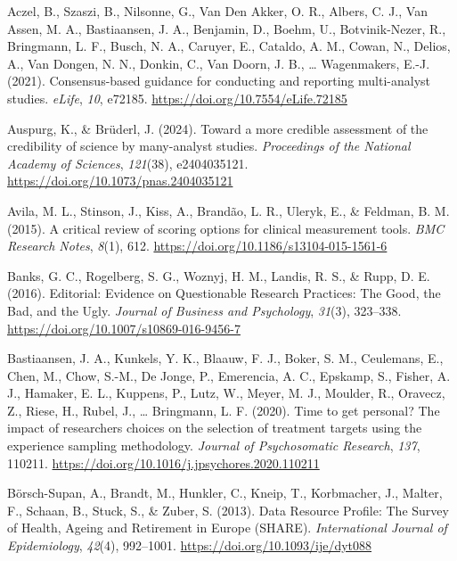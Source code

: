 \documentclass[
  man,
  floatsintext,
  longtable,
  nolmodern,
  notxfonts,
  notimes,
  colorlinks=true,linkcolor=blue,citecolor=blue,urlcolor=blue]{apa7}
\newlength{\cslhangindent}
\newenvironment{CSLReferences}[2] %
 {\begin{list}{}{%
  \setlength{\itemindent}{0pt}
  \setlength{\leftmargin}{0pt}
  \setlength{\parsep}{0pt}
  \ifodd #1
   \setlength{\leftmargin}{\cslhangindent}
   \setlength{\itemindent}{-1\cslhangindent}
  \fi
  \setlength{\itemsep}{#2\baselineskip}}}
 {\end{list}}
\begin{document}
\label{refs}
\begin{CSLReferences}{1}{0}
Aczel, B., Szaszi, B., Nilsonne, G., Van Den Akker, O. R., Albers, C.
J., Van Assen, M. A., Bastiaansen, J. A., Benjamin, D., Boehm, U.,
Botvinik-Nezer, R., Bringmann, L. F., Busch, N. A., Caruyer, E.,
Cataldo, A. M., Cowan, N., Delios, A., Van Dongen, N. N., Donkin, C.,
Van Doorn, J. B., \ldots{} Wagenmakers, E.-J. (2021). Consensus-based
guidance for conducting and reporting multi-analyst studies.
\emph{eLife}, \emph{10}, e72185.
\url{https://doi.org/10.7554/eLife.72185}

Auspurg, K., \& Brüderl, J. (2024). Toward a more credible assessment of
the credibility of science by many-analyst studies. \emph{Proceedings of
the National Academy of Sciences}, \emph{121}(38), e2404035121.
\url{https://doi.org/10.1073/pnas.2404035121}

Avila, M. L., Stinson, J., Kiss, A., Brandão, L. R., Uleryk, E., \&
Feldman, B. M. (2015). A critical review of scoring options for clinical
measurement tools. \emph{BMC Research Notes}, \emph{8}(1), 612.
\url{https://doi.org/10.1186/s13104-015-1561-6}

Banks, G. C., Rogelberg, S. G., Woznyj, H. M., Landis, R. S., \& Rupp,
D. E. (2016). Editorial: {Evidence} on {Questionable} {Research}
{Practices}: {The} {Good}, the {Bad}, and the {Ugly}. \emph{Journal of
Business and Psychology}, \emph{31}(3), 323--338.
\url{https://doi.org/10.1007/s10869-016-9456-7}

Bastiaansen, J. A., Kunkels, Y. K., Blaauw, F. J., Boker, S. M.,
Ceulemans, E., Chen, M., Chow, S.-M., De Jonge, P., Emerencia, A. C.,
Epskamp, S., Fisher, A. J., Hamaker, E. L., Kuppens, P., Lutz, W.,
Meyer, M. J., Moulder, R., Oravecz, Z., Riese, H., Rubel, J., \ldots{}
Bringmann, L. F. (2020). Time to get personal? {The} impact of
researchers choices on the selection of treatment targets using the
experience sampling methodology. \emph{Journal of Psychosomatic
Research}, \emph{137}, 110211.
\url{https://doi.org/10.1016/j.jpsychores.2020.110211}

Börsch-Supan, A., Brandt, M., Hunkler, C., Kneip, T., Korbmacher, J.,
Malter, F., Schaan, B., Stuck, S., \& Zuber, S. (2013). Data {Resource}
{Profile}: {The} {Survey} of {Health}, {Ageing} and {Retirement} in
{Europe} ({SHARE}). \emph{International Journal of Epidemiology},
\emph{42}(4), 992--1001. \url{https://doi.org/10.1093/ije/dyt088}


\end{CSLReferences}
\end{document}
